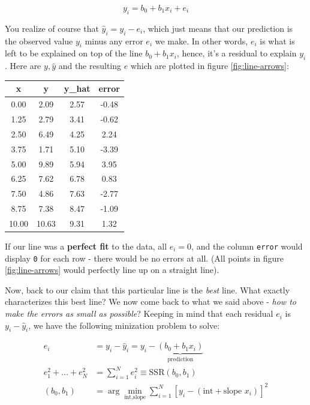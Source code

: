 \documentclass[]{book}
\begin{document}
\begin{equation}
y_i = b_0 + b_1 x_i + e_i \label{eq:abline}
\end{equation}

You realize of course that \(\hat{y}_i = y_i - e_i\), which just means
that our prediction is the observed value \(y_i\) minus any error
\(e_i\) we make. In other words, \(e_i\) is what is left to be explained
on top of the line \(b_0 + b_1 x_i\), hence, it's a residual to explain
\(y_i\). Here are \(y,\hat{y}\) and the resulting \(e\) which are
plotted in figure \ref{fig:line-arrows}:

\begin{tabular}{c|c|c|c}
\hline
x & y & y\_hat & error\\
\hline
0.00 & 2.09 & 2.57 & -0.48\\
\hline
1.25 & 2.79 & 3.41 & -0.62\\
\hline
2.50 & 6.49 & 4.25 & 2.24\\
\hline
3.75 & 1.71 & 5.10 & -3.39\\
\hline
5.00 & 9.89 & 5.94 & 3.95\\
\hline
6.25 & 7.62 & 6.78 & 0.83\\
\hline
7.50 & 4.86 & 7.63 & -2.77\\
\hline
8.75 & 7.38 & 8.47 & -1.09\\
\hline
10.00 & 10.63 & 9.31 & 1.32\\
\hline
\end{tabular}

If our line was a \textbf{perfect fit} to the data, all \(e_i = 0\), and
the column \texttt{error} would display \texttt{0} for each row - there
would be no errors at all. (All points in figure \ref{fig:line-arrows}
would perfectly line up on a straight line).

Now, back to our claim that this particular line is the \emph{best}
line. What exactly characterizes this best line? We now come back to
what we said above - \emph{how to make the errors as small as possible}?
Keeping in mind that each residual \(e_i\) is \(y_i - \hat{y}_i\), we
have the following minization problem to solve:

\begin{align}
e_i & = y_i - \hat{y}_i = y_i - \underbrace{\left(b_0 + b_1 x_i\right)}_\text{prediction}\\
e_1^2 + \dots + e_N^2 &= \sum_{i=1}^N e_i^2 \equiv \text{SSR}(b_0,b_1) \\
(b_0,b_1) &= \arg \min_{\text{int},\text{slope}} \sum_{i=1}^N \left[y_i - \left(\text{int} + \text{slope } x_i\right)\right]^2 \label{eq:ols-min}
\end{align}
\end{document}
